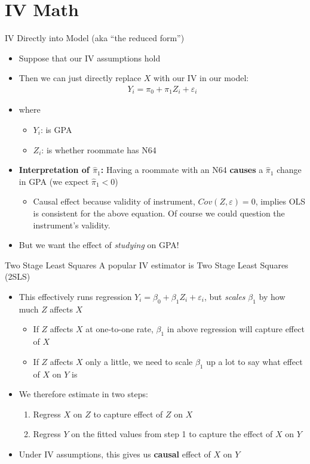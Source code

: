 \documentclass[aspectratio=169,11pt]{beamer}
\begin{document}
\section{IV Math}
\begin{frame}{IV Directly into Model (aka ``the reduced form'')}
\begin{itemize}
\item Suppose that our IV assumptions hold
\medskip
\item Then we can just directly replace $X$ with our IV in our model:
\begin{align*}
Y_i=\pi_0 + \pi_1 Z_i + \varepsilon_i
\end{align*}
\item where
\begin{itemize}
\item $Y_i$: is GPA
\item $Z_i$: is whether roommate has N64
\end{itemize}
\medskip
\item \textbf{Interpretation of $\hat{\pi}_1$:} Having a roommate with an N64 \textbf{causes} a $\hat{\pi}_1$ change in GPA (we expect $\hat{\pi}_1<0$)
\begin{itemize}
\item Causal effect because validity of instrument, $Cov(Z,\varepsilon)=0$, implies OLS is consistent for the above equation.
Of course we could question the instrument's validity.
\end{itemize}
\medskip
\item But we want the effect of \emph{studying} on GPA!
\end{itemize}
\end{frame}

\begin{frame}{Two Stage Least Squares}
A popular IV estimator is Two Stage Least Squares (2SLS)
\begin{itemize}
\item This effectively runs regression $Y_i=\beta_0 + \beta_1 Z_i + \varepsilon_i$, but \emph{scales} $\beta_1$ by how much $Z$ affects $X$
\begin{itemize}
\item If $Z$ affects $X$ at one-to-one rate, $\beta_1$ in above regression will capture effect of $X$
\item If $Z$ affects $X$ only a little, we need to scale $\beta_1$ up a lot to say what effect of $X$ on $Y$ is
\end{itemize}
\medskip
\item We therefore estimate in two steps:
\begin{enumerate}
\item Regress $X$ on $Z$ to capture effect of $Z$ on $X$
\item Regress $Y$ on the fitted values from step 1 to capture the effect of $X$ on $Y$
\end{enumerate}
\smallskip
\item Under IV assumptions, this gives us \textbf{causal} effect of $X$ on $Y$
\end{itemize}
\end{frame}
\end{document}
